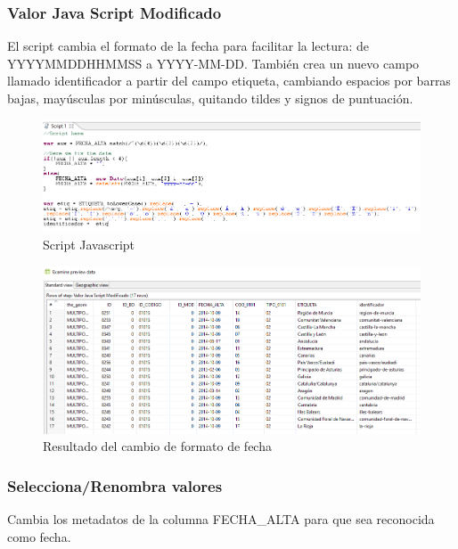 \subsubsection{Valor Java Script Modificado}
El script cambia el formato de la fecha para facilitar la lectura: de YYYYMMDDHHMMSS a YYYY-MM-DD. También
crea un nuevo campo llamado identificador a partir del campo etiqueta, cambiando espacios por barras bajas, mayúsculas
por minúsculas, quitando tildes y signos de puntuación.

\begin{figure}[h]
    \includegraphics[width=\textwidth]{images/script.png}
    \centering
    \caption{Script Javascript}
    \label{fig:script}
\end{figure}

\begin{figure}[h]
    \includegraphics[width=\textwidth]{images/fecha.png}
    \centering
    \caption{Resultado del cambio de formato de fecha}
    \label{fig:fecha}
\end{figure}

\subsubsection{Selecciona/Renombra valores}
Cambia los metadatos de la columna FECHA\_ALTA para que sea reconocida como fecha.
